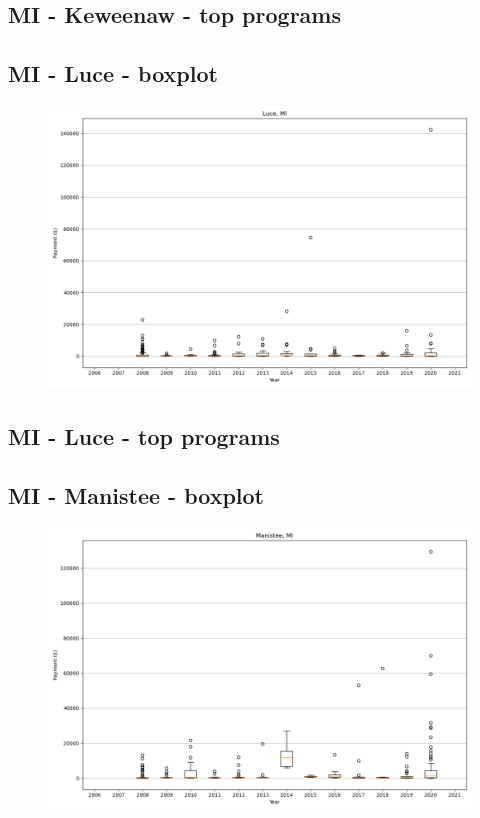 \subsection*{MI - Keweenaw - top programs}

\newpage
\subsection*{MI - Luce - boxplot}
\begin{figure}[h]
\centering
\includegraphics[width=7in]{../output/boxplots/counties/Luce-MI_boxplot.png}
\end{figure}


\subsection*{MI - Luce - top programs}

\newpage
\subsection*{MI - Manistee - boxplot}
\begin{figure}[h]
\centering
\includegraphics[width=7in]{../output/boxplots/counties/Manistee-MI_boxplot.png}
\end{figure}


